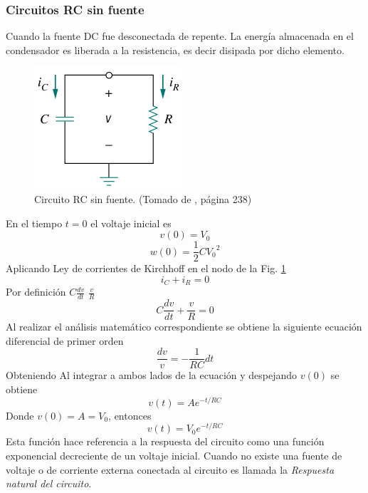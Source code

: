 \documentclass[twocolumn]{IEEEtran}
\begin{document}
\subsubsection{Circuitos RC sin fuente}
\noindent
Cuando la fuente DC fue desconectada de repente. La energía almacenada en el condensador es liberada a la resistencia, es decir disipada por dicho elemento.
\begin{figure}[H]
	\centering
		\includegraphics[scale=0.7]{rcsinsource.png}
	\caption{Circuito RC sin fuente. (Tomado de \cite{sadiku}, página 238)}
	\label{rcsin}
\end{figure}
\noindent
En el tiempo $t=0$ el voltaje inicial es
\begin{equation}
 v(0)=V_{0}
\end{equation}
\begin{equation}
 w(0) = \frac{1}{2} C {V_{0}}^{2}
\end{equation}
\noindent
Aplicando Ley de corrientes de Kirchhoff en el nodo de la Fig. \ref{rcsin}
\begin{equation}
 i_C + i_R = 0
\end{equation}
\noindent
Por definición $C\frac{{dv}}{{dt}}$ $\frac{v}{R}$
\begin{equation}
 C\frac{{dv}}{{dt}} + \frac{v}{R} = 0
\end{equation}
\noindent
Al realizar el análisis matemático correspondiente se obtiene la siguiente ecuación diferencial de primer orden
\begin{equation}
 \frac{dv}{v} = -\frac{1}{RC} dt
\end{equation}
\noindent
Obteniendo Al integrar a ambos lados de la ecuación y despejando $v(0)$ se obtiene
\begin{equation}
 v(t) = A{e^{ - t/RC}}
\end{equation}
\noindent
Donde $v(0) = A = V_{0}$, entonces
\begin{equation}
 v(t) = V_{0}{e^{ - t/RC}}
\label{eqnat}
\end{equation}
\noindent
Esta función hace referencia a la respuesta del circuito como una función exponencial decreciente de un voltaje inicial. Cuando no existe una fuente de voltaje o de corriente externa conectada al circuito es llamada la \textit{Respuesta natural del circuito}.
\end{document}
